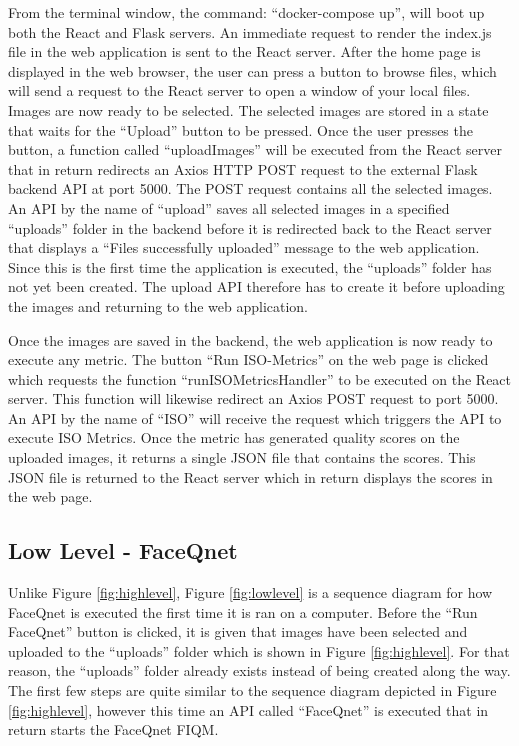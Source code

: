 \raggedbottom

From the terminal window, the command: ``docker-compose up'', will boot up both the React and Flask servers. An immediate request to render the index.js file in the web application is sent to the React server. After the home page is displayed in the web browser, the user can press a button to browse files, which will send a request to the React server to open a window of your local files. Images are now ready to be selected. The selected images are stored in a state that waits for the ``Upload'' button to be pressed. Once the user presses the button, a function called ``uploadImages'' will be executed from the React server that in return redirects an Axios HTTP POST request to the external Flask backend API at port 5000. The POST request contains all the selected images. An API by the name of ``upload'' saves all selected images in a specified ``uploads'' folder in the backend before it is redirected back to the React server that displays a ``Files successfully uploaded'' message to the web application. Since this is the first time the application is executed, the ``uploads'' folder has not yet been created. The upload API therefore has to create it before uploading the images and returning to the web application. 


Once the images are saved in the backend, the web application is now ready to execute any metric. The button ``Run ISO-Metrics'' on the web page is clicked which requests the function ``runISOMetricsHandler'' to be executed on the React server. This function will likewise redirect an Axios POST request to port 5000. An API by the name of ``ISO'' will receive the request which triggers the API to execute ISO Metrics. Once the metric has generated quality scores on the uploaded images, it returns a single JSON file that contains the scores. This JSON file is returned to the React server which in return displays the scores in the web page. 

\subsection{Low Level - FaceQnet}
Unlike Figure \ref{fig:highlevel}, Figure \ref{fig:lowlevel} is a sequence diagram for how FaceQnet is executed the first time it is ran on a computer. Before the ``Run FaceQnet'' button is clicked, it is given that images have been selected and uploaded to the ``uploads'' folder which is shown in Figure \ref{fig:highlevel}. For that reason, the ``uploads'' folder already exists instead of being created along the way. The first few steps are quite similar to the sequence diagram depicted in Figure \ref{fig:highlevel}, however this time an API called ``FaceQnet'' is executed that in return starts the FaceQnet FIQM. 


